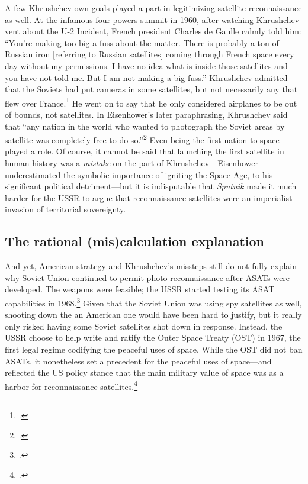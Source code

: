 \documentclass[11pt]{memoir}
\begin{document}
A few Khrushchev own-goals played a part in legitimizing satellite reconnaissance as well. At the infamous four-powers summit in 1960, after watching Khrushchev vent about the U-2 Incident, French president Charles de Gaulle calmly told him: ``You're making too big a fuss about the matter. There is probably a ton of Russian iron [referring to Russian satellites] coming through French space every day without my permissions. I have no idea what is inside those satellites and you have not told me. But I am not making a big fuss.'' Khrushchev admitted that the Soviets had put cameras in some satellites, but not necessarily any that flew over France.\footcite[p.~353]{brugioni_eyes_2010} He went on to say that he only considered airplanes to be out of bounds, not satellites. In Eisenhower's later paraphrasing, Khrushchev said that ``any nation in the world who wanted to photograph the Soviet areas by satellite was completely free to do so.''\footcite[p.~556]{eisenhower_waging_1965} Even being the first nation to space played a role. Of course, it cannot be said that launching the first satellite in human history was a \emph{mistake} on the part of Khrushchev---Eisenhower underestimated the symbolic importance of igniting the Space Age, to his significant political detriment---but it is indisputable that \emph{Sputnik} made it much harder for the USSR to argue that reconnaissance satellites were an imperialist invasion of territorial sovereignty.

\subsection{The rational (mis)calculation explanation}
And yet, American strategy and Khrushchev's missteps still do not fully explain why Soviet Union continued to permit photo-reconnaissance after ASATs were developed. The weapons were feasible; the USSR started testing its ASAT capabilities in 1968.\footcite[p.~149]{karas_new_1983} Given that the Soviet Union was using spy satellites as well, shooting down the an American one would have been hard to justify, but it really only risked having some Soviet satellites shot down in response. Instead, the USSR choose to help write and ratify the Outer Space Treaty (OST) in 1967, the first legal regime codifying the peaceful uses of space. While the OST did not ban ASATs, it nonetheless set a precedent for the peaceful uses of space---and reflected the US policy stance that the main military value of space was as a harbor for reconnaissance satellites.\footcite[p~16]{mowthorpe_militarization_2004}
\end{document}
